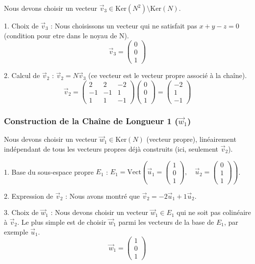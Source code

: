\documentclass[french]{yLectureNote}
\renewcommand{\vec}{\overrightarrow}
\renewcommand{\vec}{\overrightarrow}
\begin{document}
Nous devons choisir un vecteur $\vec{v}_3 \in \text{Ker}(N^2) \setminus \text{Ker}(N)$.

1.  Choix de $\vec{v}_3$ :
    Nous choisissons un vecteur qui ne satisfait pas $x+y-z=0$ (condition pour etre dans le noyau de N).
    $$\vec{v}_3 = \begin{pmatrix} 0 \\ 0 \\ 1 \end{pmatrix}$$

2.  Calcul de $\vec{v}_2$ :
    $\vec{v}_2 = N \vec{v}_3$ (ce vecteur est le vecteur propre associé à la chaîne).
    $$\vec{v}_2 = \begin{pmatrix} 2 & 2 & -2 \\ -1 & -1 & 1 \\ 1 & 1 & -1 \end{pmatrix} \begin{pmatrix} 0 \\ 0 \\ 1 \end{pmatrix} = \begin{pmatrix} -2 \\ 1 \\ -1 \end{pmatrix}$$

\subsubsection{Construction de la Chaîne de Longueur 1 ($\vec{w}_1$)}

Nous devons choisir un vecteur $\vec{w}_1 \in \text{Ker}(N)$ (vecteur propre), linéairement indépendant de tous les vecteurs propres déjà construits (ici, seulement $\vec{v}_2$).

1.  Base du sous-espace propre $E_1$ :
    $E_1 = \text{Vect} \left( \vec{u}_1 = \begin{pmatrix} 1 \\ 0 \\ 1 \end{pmatrix}, \quad \vec{u}_2 = \begin{pmatrix} 0 \\ 1 \\ 1 \end{pmatrix} \right)$.

2.  Expression de $\vec{v}_2$ :
    Nous avons montré que $\vec{v}_2 = -2\vec{u}_1 + 1\vec{u}_2$.

3.  Choix de $\vec{w}_1$ :
    Nous devons choisir un vecteur $\vec{w}_1 \in E_1$ qui ne soit pas colinéaire à $\vec{v}_2$. Le plus simple est de choisir $\vec{w}_1$ parmi les vecteurs de la base de $E_1$, par exemple $\vec{u}_1$.
    $$\vec{w}_1 = \begin{pmatrix} 1 \\ 0 \\ 1 \end{pmatrix}$$
\end{document}
